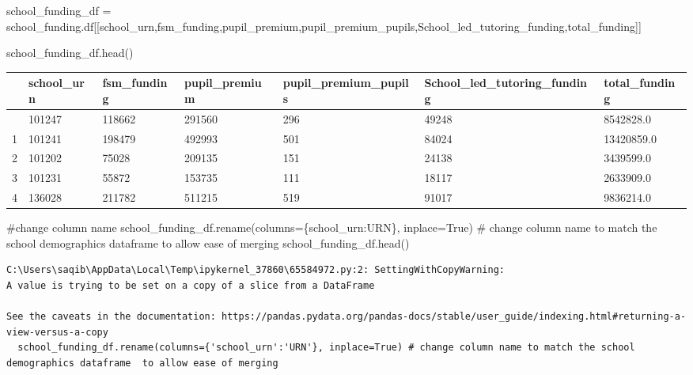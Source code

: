 \documentclass[
  letterpaper,
  DIV=11,
  numbers=noendperiod]{scrartcl}
\newenvironment{Shaded}{\begin{snugshade}}{\end{snugshade}}
\newcommand{\CommentTok}[1]{\textcolor[rgb]{0.37,0.37,0.37}{#1}}
\newcommand{\NormalTok}[1]{\textcolor[rgb]{0.00,0.23,0.31}{#1}}
\newcommand{\OperatorTok}[1]{\textcolor[rgb]{0.37,0.37,0.37}{#1}}
\newcommand{\StringTok}[1]{\textcolor[rgb]{0.13,0.47,0.30}{#1}}
\newcommand{\VariableTok}[1]{\textcolor[rgb]{0.07,0.07,0.07}{#1}}
\begin{document}
\begin{Shaded}
\begin{Highlighting}[]
\NormalTok{school\_funding\_df }\OperatorTok{=}\NormalTok{ school\_funding.df[[}\StringTok{\textquotesingle{}school\_urn\textquotesingle{}}\NormalTok{,}\StringTok{\textquotesingle{}fsm\_funding\textquotesingle{}}\NormalTok{,}\StringTok{\textquotesingle{}pupil\_premium\textquotesingle{}}\NormalTok{,}\StringTok{\textquotesingle{}pupil\_premium\_pupils\textquotesingle{}}\NormalTok{,}\StringTok{\textquotesingle{}School\_led\_tutoring\_funding\textquotesingle{}}\NormalTok{,}\StringTok{\textquotesingle{}total\_funding\textquotesingle{}}\NormalTok{]]}

\NormalTok{school\_funding\_df.head()}

\end{Highlighting}
\end{Shaded}

\begin{longtable}[]{@{}lllllll@{}}
\toprule\noalign{}
& school\_urn & fsm\_funding & pupil\_premium & pupil\_premium\_pupils &
School\_led\_tutoring\_funding & total\_funding \\
\midrule\noalign{}
\endhead
\bottomrule\noalign{}
\endlastfoot
0 & 101247 & 118662 & 291560 & 296 & 49248 & 8542828.0 \\
1 & 101241 & 198479 & 492993 & 501 & 84024 & 13420859.0 \\
2 & 101202 & 75028 & 209135 & 151 & 24138 & 3439599.0 \\
3 & 101231 & 55872 & 153735 & 111 & 18117 & 2633909.0 \\
4 & 136028 & 211782 & 511215 & 519 & 91017 & 9836214.0 \\
\end{longtable}

\begin{Shaded}
\begin{Highlighting}[]
\CommentTok{\#change column name}
\NormalTok{school\_funding\_df.rename(columns}\OperatorTok{=}\NormalTok{\{}\StringTok{\textquotesingle{}school\_urn\textquotesingle{}}\NormalTok{:}\StringTok{\textquotesingle{}URN\textquotesingle{}}\NormalTok{\}, inplace}\OperatorTok{=}\VariableTok{True}\NormalTok{) }\CommentTok{\# change column name to match the school demographics dataframe  to allow ease of merging }
\NormalTok{school\_funding\_df.head()}
\end{Highlighting}
\end{Shaded}

\begin{verbatim}
C:\Users\saqib\AppData\Local\Temp\ipykernel_37860\65584972.py:2: SettingWithCopyWarning: 
A value is trying to be set on a copy of a slice from a DataFrame

See the caveats in the documentation: https://pandas.pydata.org/pandas-docs/stable/user_guide/indexing.html#returning-a-view-versus-a-copy
  school_funding_df.rename(columns={'school_urn':'URN'}, inplace=True) # change column name to match the school demographics dataframe  to allow ease of merging
\end{verbatim}
\end{document}
